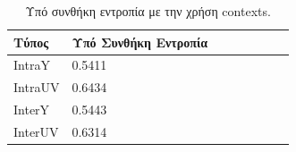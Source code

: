 \begin{table}[h!]
    \begin{center}
        \begin{tabular}{| l | l | l | l | l | l | l | l |}
        \hline
        Τύπος    & Υπό Συνθήκη Εντροπία \\ \hline
        IntraY   & 0.5411   \\ \hline
        IntraUV  & 0.6434   \\ \hline
        InterY   & 0.5443   \\ \hline
        InterUV  & 0.6314   \\ \hline
        \hline
        \end{tabular}
    \end{center}
    \caption{Υπό συνθήκη εντροπία με την χρήση contexts.}
    \label{table:conentropy}
\end{table} 